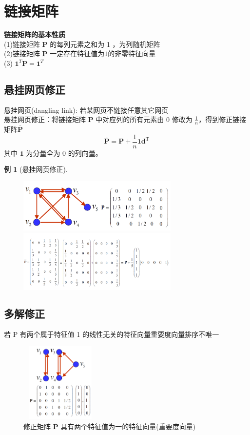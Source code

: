 \documentclass[12pt, a4paper, oneside]{ctexbook}
\newtheorem{example}[theorem]{例}
\begin{document}
\section{链接矩阵}
\noindent\textbf{链接矩阵的基本性质}\\
(1)链接矩阵 $\mathbf{P}$ 的每列元素之和为 1 ，为列随机矩阵\\
(2)链接矩阵 $\mathbf{P}$ 一定存在特征值为$1$的非零特征向量\\
(3)  $\mathbf{1}^T \mathbf{P} = \mathbf{1}^T$

\subsection{悬挂网页修正}
\noindent 悬挂网页(dangling link): 若某网页不链接任意其它网页\\
悬挂网页修正：将链接矩阵 $\mathbf{P}$ 中对应列的所有元素由 $0$ 修改为 $\frac{1}{n}$，得到修正链接矩阵$\overline{\mathbf{P}}$\\
$$\overline{\mathbf{P}}=\mathbf{P}+\frac1n\mathbf{1}\mathbf{d}^\mathrm{T}$$
其中 $\mathbf{1}$ 为分量全为 $0$ 的列向量。
\begin{example}[悬挂网页修正]
    \begin{figure}[H]
        \centering
        \includegraphics[width = 8cm]{assets/修正矩阵-原矩阵.png}
        \includegraphics[width=8cm]{assets/修正矩阵-修正后矩阵.png}       
    \end{figure}
\end{example}
\subsection{多解修正}
若 P 有两个属于特征值 1 的线性无关的特征向量重要度向量排序不唯一\\
\begin{figure}[H]
    \centering
    \includegraphics[width = 4cm,height = 4cm]{assets/两个特征向量的修正矩阵.png}
    \caption{修正矩阵 $\overline{\mathbf{P}}$ 具有两个特征值为一的特征向量(重要度向量)}  
\end{figure}
\end{document}
